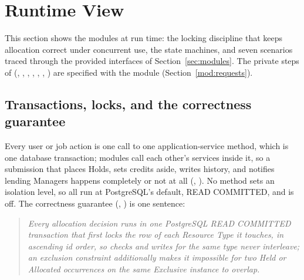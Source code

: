 \begingroup\setlength{\emergencystretch}{2em}
\section{Runtime View}\label{sec:runtime}

This section shows the modules at run time: the locking discipline that keeps allocation correct under concurrent use, the state machines, and seven scenarios traced through the provided interfaces of Section~\ref{sec:modules}. The private steps of  (, , , , , , ) are specified with the  module (Section~\ref{mod:requests}).

\subsection{Transactions, locks, and the correctness guarantee}

Every user or job action is one call to one  application-service method, which is one database transaction; modules call each other's services inside it, so a submission that places Holds, sets credits aside, writes history, and notifies lending Managers happens completely or not at all (, ). No method sets an isolation level, so all run at PostgreSQL's default, READ COMMITTED, and  is off. The correctness guarantee (, ) is one sentence:

\begin{quote}\itshape
Every allocation decision runs in one PostgreSQL READ COMMITTED transaction that first locks the row of each Resource Type it touches, in ascending id order, so checks and writes for the same type never interleave; an exclusion constraint additionally makes it impossible for two Held or Allocated occurrences on the same Exclusive instance to overlap.
\end{quote}

